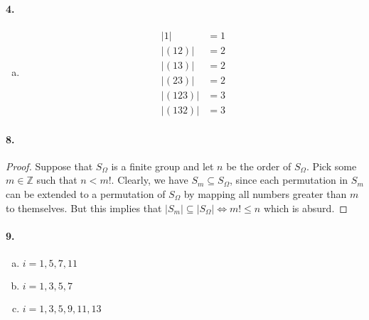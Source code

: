 \documentclass{article}
\begin{document}
\paragraph{4.}
\begin{enumerate}[(a)]
  \item \begin{align*}
      |1| &= 1 \\
      |(1 2)| &= 2 \\
      |(1 3)| &= 2 \\
      |(2 3)| &= 2 \\
      |(1 2 3)| &= 3 \\
      |(1 3 2)| &= 3
  \end{align*}
\end{enumerate}

\paragraph{8.}
\begin{proof}
  Suppose that $S_\Omega$ is a finite group and let $n$ be the order of
  $S_\Omega$. Pick some $m \in \mathbb{Z}$ such that $n < m!$. Clearly, we have
  $S_m \subseteq S_\Omega$, since each permutation in $S_m$ can be extended to
  a permutation of $S_\Omega$ by mapping all numbers greater than $m$ to
  themselves. But this implies that $|S_m| \subseteq |S_\Omega| \iff m! \leq n$
  which is absurd.
\end{proof}

\paragraph{9.}
\begin{enumerate}[(a)]
  \item $i = 1, 5, 7, 11$
  \item $i = 1, 3, 5, 7$
  \item $i = 1, 3, 5, 9, 11, 13$
\end{enumerate}
\end{document}
